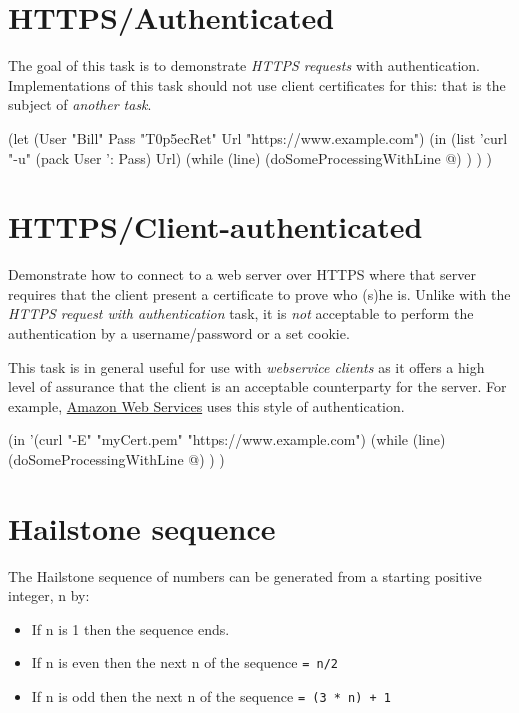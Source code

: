 \pagebreak{}
\section*{HTTPS/Authenticated}

The goal of this task is to demonstrate \emph{HTTPS requests} with
authentication. Implementations of this task should not use client
certificates for this: that is the subject of \emph{another task}.

\begin{wideverbatim}

(let (User "Bill"  Pass "T0p5ecRet"  Url "https://www.example.com")
   (in (list 'curl "-u" (pack User ': Pass) Url)
      (while (line)
         (doSomeProcessingWithLine @) ) ) )

\end{wideverbatim}

\pagebreak{}
\section*{HTTPS/Client-authenticated}

Demonstrate how to connect to a web server over HTTPS where that
server requires that the client present a certificate to prove who
(s)he is. Unlike with the \emph{HTTPS request with authentication}
task, it is \emph{not} acceptable to perform the authentication by a
username/password or a set cookie.

This task is in general useful for use with \emph{webservice clients}
as it offers a high level of assurance that the client is an
acceptable counterparty for the server. For example,
\href{http://aws.amazon.com/}{Amazon Web Services} uses this style of
authentication.

\begin{wideverbatim}

(in '(curl "-E" "myCert.pem" "https://www.example.com")
   (while (line)
      (doSomeProcessingWithLine @) ) )

\end{wideverbatim}

\pagebreak{}
\section*{Hailstone sequence}

The Hailstone sequence of numbers can be generated from a starting
positive integer, n by:

\begin{itemize}
\item
  If n is 1 then the sequence ends.
\item
  If n is even then the next n of the sequence \texttt{= n/2}
\item
  If n is odd then the next n of the sequence \texttt{= (3 * n) + 1}
\end{itemize}

